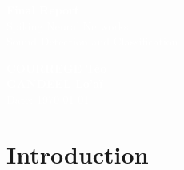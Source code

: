 \documentclass[11pt]{article}
\begin{document}
\pagecolor{darkbluegrey}
\afterpage{\nopagecolor}


\begin{titlepage}
  \begin{center}
    \textcolor{white}{\textbf{\Huge Final Report}}\\
    \vspace{1cm}
    \textcolor{white}{\Large Spiking Neural Networks\\Sound Detection and Classification}
    \vspace{3cm}
  \end{center}
  \begin{center}
    \textcolor{white}{
      \textbf{COURREGE Téo}\\
      \textbf{GANDEEL Lo'aï}\\
      \vspace{1cm}
      \Large Date: \today}
  \end{center}
\end{titlepage}

\newpage

\tableofcontents

\pagebreak

\listoffigures

\pagebreak

\section{Introduction}
\end{document}
